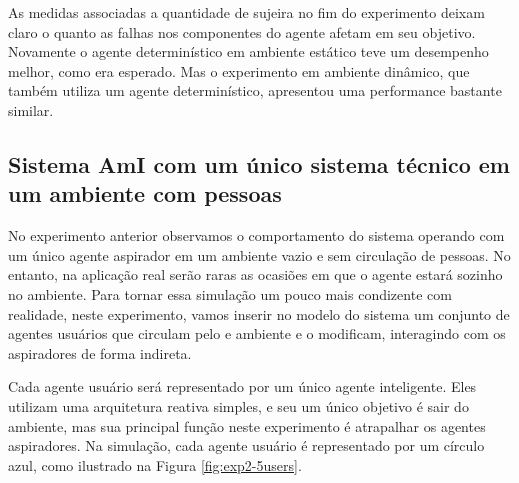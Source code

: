 \begin{figure}[h!]
    \centering
\end{figure}

As medidas associadas a quantidade de sujeira no fim do experimento deixam claro o quanto as falhas nos componentes do agente afetam em seu objetivo. Novamente o agente determinístico em ambiente estático teve um desempenho melhor, como era esperado. Mas o experimento em ambiente dinâmico, que também utiliza um agente determinístico, apresentou uma performance bastante similar. 

\subsection{Sistema AmI com um único sistema técnico em um ambiente com pessoas}
\label{sec:exp-user}
No experimento anterior observamos o comportamento do sistema operando com um único agente aspirador em um ambiente vazio e sem circulação de pessoas. No entanto, na aplicação real serão raras as ocasiões em que o agente estará sozinho no ambiente. Para tornar essa simulação um pouco mais condizente com realidade, neste experimento, vamos inserir no modelo do sistema um conjunto de agentes usuários que circulam pelo e ambiente e o modificam, interagindo com os aspiradores de forma indireta.

Cada agente usuário será representado por um único agente inteligente. Eles utilizam uma arquitetura reativa simples, e seu um único objetivo é sair do ambiente, mas sua principal função neste experimento é atrapalhar os agentes aspiradores. Na simulação, cada agente usuário é representado por um círculo azul, como ilustrado na Figura \ref{fig:exp2-5users}. 

